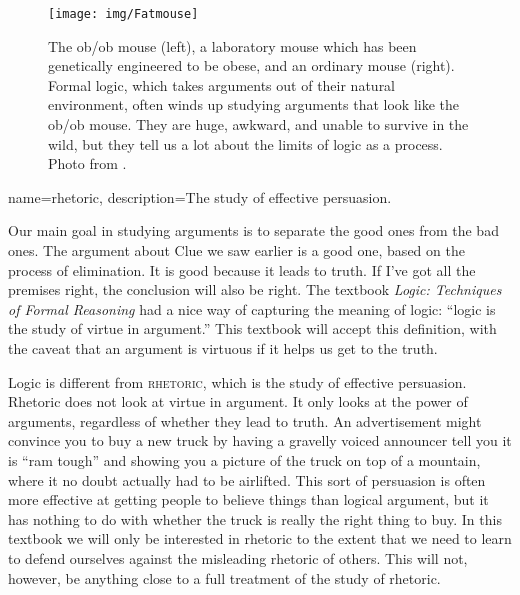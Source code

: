 \begin{figure}
\begin{mdframed}[style=mytableclearbox]
\begin{center}
\texttt{[image: img/Fatmouse]}
\end{center}
\end{mdframed}
\caption{The ob/ob mouse (left), a laboratory mouse which has been genetically engineered to be obese, and an ordinary mouse (right). Formal logic, which takes arguments out of their natural environment, often winds up studying arguments that look like the ob/ob mouse. They are huge, awkward, and unable to survive in the wild, but they tell us a lot about the limits of logic as a process. Photo from \cite{WikimediaCommons2006}.}
\label{fig:ob_ob_mouse}
\end{figure}


{
name=rhetoric,
description={The study of effective persuasion.}
}


Our main goal in studying arguments is to separate the good ones from the bad ones. The argument about Clue we saw earlier is a good one, based on the process of elimination.  It is good because it leads to truth. If I've got all the premises right, the conclusion will also be right. The textbook \textit{Logic: Techniques of Formal Reasoning} \citep{Kalish1980} had a nice way of capturing the meaning of logic: ``logic is the study of virtue in argument.'' \label{virtue_in_argument} This textbook will accept this definition, with the caveat that an argument is virtuous if it helps us get to the truth.

Logic is different from \textsc{\gls{rhetoric}}, which is the study of effective persuasion. Rhetoric does not look at virtue in argument. It only looks at the power of arguments, regardless of whether they lead to truth. An advertisement might convince you to buy a new truck by having a gravelly voiced announcer tell you it is ``ram tough'' and showing you a picture of the truck on top of a mountain, where it no doubt actually had to be airlifted. This sort of persuasion is often more effective at getting people to believe things than logical argument, but it has nothing to do with whether the truck is really the right thing to buy. In this textbook we will only be interested in rhetoric to the extent that we need to learn to defend ourselves against the misleading rhetoric of others. This will not, however, be anything close to a full treatment of the study of rhetoric.


